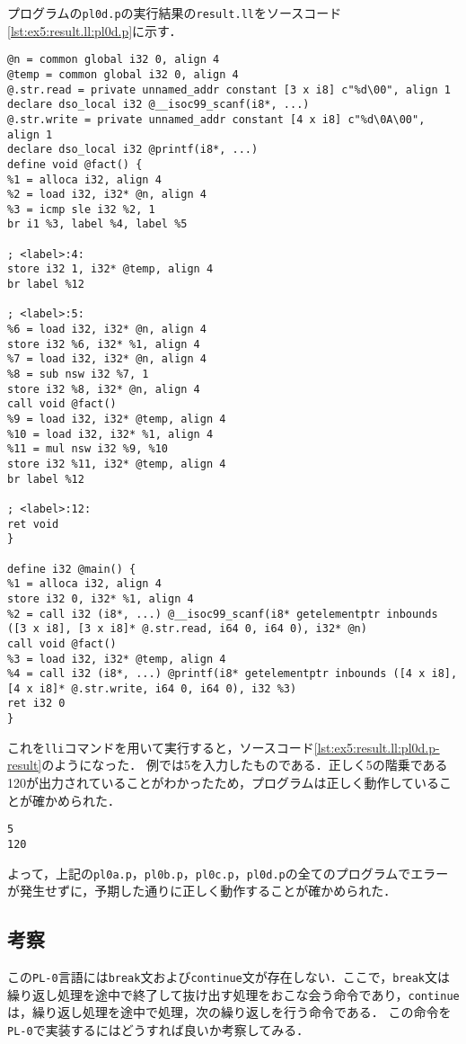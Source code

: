 \documentclass[uplatex]{jsarticle}
\begin{document}
プログラムの\verb#pl0d.p#の実行結果の\verb#result.ll#をソースコード\ref{lst:ex5:result.ll:pl0d.p}に示す．
\begin{lstlisting}[caption=condition句の処理,label=lst:ex5:result.ll:pl0d.p]
@n = common global i32 0, align 4
@temp = common global i32 0, align 4
@.str.read = private unnamed_addr constant [3 x i8] c"%d\00", align 1
declare dso_local i32 @__isoc99_scanf(i8*, ...)
@.str.write = private unnamed_addr constant [4 x i8] c"%d\0A\00", align 1
declare dso_local i32 @printf(i8*, ...)
define void @fact() {
%1 = alloca i32, align 4
%2 = load i32, i32* @n, align 4
%3 = icmp sle i32 %2, 1
br i1 %3, label %4, label %5

; <label>:4:
store i32 1, i32* @temp, align 4
br label %12

; <label>:5:
%6 = load i32, i32* @n, align 4
store i32 %6, i32* %1, align 4
%7 = load i32, i32* @n, align 4
%8 = sub nsw i32 %7, 1
store i32 %8, i32* @n, align 4
call void @fact()
%9 = load i32, i32* @temp, align 4
%10 = load i32, i32* %1, align 4
%11 = mul nsw i32 %9, %10
store i32 %11, i32* @temp, align 4
br label %12

; <label>:12:
ret void
}

define i32 @main() {
%1 = alloca i32, align 4
store i32 0, i32* %1, align 4
%2 = call i32 (i8*, ...) @__isoc99_scanf(i8* getelementptr inbounds ([3 x i8], [3 x i8]* @.str.read, i64 0, i64 0), i32* @n)
call void @fact()
%3 = load i32, i32* @temp, align 4
%4 = call i32 (i8*, ...) @printf(i8* getelementptr inbounds ([4 x i8], [4 x i8]* @.str.write, i64 0, i64 0), i32 %3)
ret i32 0
}
\end{lstlisting}
これを\verb#lli#コマンドを用いて実行すると，ソースコード\ref{lst:ex5:result.ll:pl0d.p-result}のようになった．
例では5を入力したものである．正しく5の階乗である120が出力されていることがわかったため，プログラムは正しく動作していることが確かめられた．
\begin{lstlisting}[caption=pl0b.pから出力されたresult.llの実行結果,label=lst:ex5:result.ll:pl0d.p-result]
5
120
\end{lstlisting}
よって，上記の\verb#pl0a.p#，\verb#pl0b.p#，\verb#pl0c.p#，\verb#pl0d.p#の全てのプログラムでエラーが発生せずに，予期した通りに正しく動作することが確かめられた．
\subsection{考察}
この\verb#PL-0#言語には\verb#break#文および\verb#continue#文が存在しない．ここで，\verb#break#文は繰り返し処理を途中で終了して抜け出す処理をおこな会う命令であり，\verb#continue#は，繰り返し処理を途中で処理，次の繰り返しを行う命令である．
この命令を\verb#PL-0#で実装するにはどうすれば良いか考察してみる．
\end{document}
